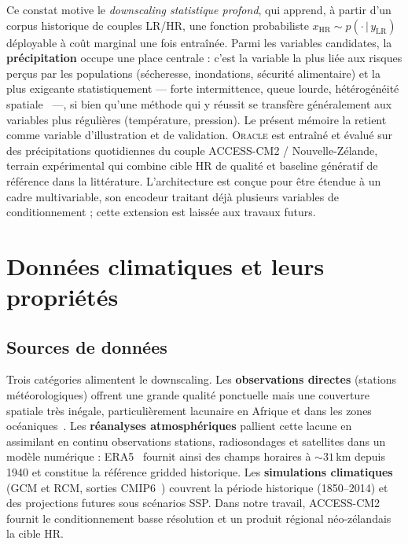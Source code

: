\documentclass[14pt,a4paper,openany]{extreport}
\theoremstyle{definition}
\newcommand{\Oracle}{\textsc{Oracle}}
\newcommand{\LR}{\ensuremath{\text{LR}}}
\newcommand{\HR}{\ensuremath{\text{HR}}}
\newcommand{\xHR}{\ensuremath{x_{\HR}}}
\newcommand{\yLR}{\ensuremath{y_{\LR}}}
\begin{document}
Ce constat motive le \emph{downscaling statistique profond}, qui apprend, à partir d'un corpus historique de couples LR/HR, une fonction probabiliste $\xHR \sim p(\cdot\,|\,\yLR)$ déployable à coût marginal une fois entraînée.
\label{ssec:cas-precipitation}
Parmi les variables candidates, la \textbf{précipitation} occupe une place centrale : c'est la variable la plus liée aux risques perçus par les populations (sécheresse, inondations, sécurité alimentaire) et la plus exigeante statistiquement --- forte intermittence, queue lourde, hétérogénéité spatiale~\cite{maraun_widmann_2018,vandal_deepsd_2017} ---, si bien qu'une méthode qui y réussit se transfère généralement aux variables plus régulières (température, pression). Le présent mémoire la retient comme variable d'illustration et de validation. \Oracle{} est entraîné et évalué sur des précipitations quotidiennes du couple ACCESS-CM2 / Nouvelle-Zélande, terrain expérimental qui combine cible HR de qualité et baseline génératif de référence dans la littérature. L'architecture est conçue pour être étendue à un cadre multivariable, son encodeur traitant déjà plusieurs variables de conditionnement ; cette extension est laissée aux travaux futurs.

\section{Données climatiques et leurs propriétés}
\label{sec:donnees}

\subsection{Sources de données}
\label{ssec:sources}

Trois catégories alimentent le downscaling. Les \textbf{observations directes} (stations météorologiques) offrent une grande qualité ponctuelle mais une couverture spatiale très inégale, particulièrement lacunaire en Afrique et dans les zones océaniques~\cite{wmo_gcos_2022}. Les \textbf{réanalyses atmosphériques} pallient cette lacune en assimilant en continu observations stations, radiosondages et satellites dans un modèle numérique : ERA5~\cite{hersbach_era5_2020} fournit ainsi des champs horaires à $\sim$$31\,\mathrm{km}$ depuis 1940 et constitue la référence gridded historique. Les \textbf{simulations climatiques} (GCM et RCM, sorties CMIP6~\cite{eyring_cmip6_2016}) couvrent la période historique (1850--2014) et des projections futures sous scénarios SSP. Dans notre travail, ACCESS-CM2 fournit le conditionnement basse résolution et un produit régional néo-zélandais la cible HR.
\end{document}
